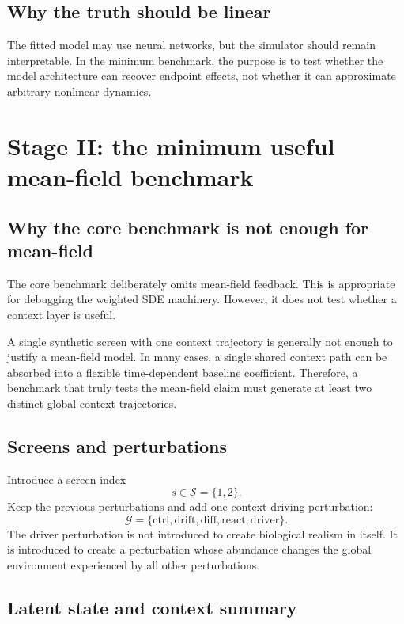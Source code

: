 \documentclass[11pt]{article}
\newcommand{\Gcal}{\mathcal{G}}
\newcommand{\Scal}{\mathcal{S}}
\begin{document}
\subsection{Why the truth should be linear}

The fitted model may use neural networks, but the simulator should remain interpretable. In the minimum benchmark, the purpose is to test whether the model architecture can recover endpoint effects, not whether it can approximate arbitrary nonlinear dynamics.

\section{Stage II: the minimum useful mean-field benchmark}

\subsection{Why the core benchmark is not enough for mean-field}

The core benchmark deliberately omits mean-field feedback. This is appropriate for debugging the weighted SDE machinery. However, it does not test whether a context layer is useful.

A single synthetic screen with one context trajectory is generally not enough to justify a mean-field model. In many cases, a single shared context path can be absorbed into a flexible time-dependent baseline coefficient. Therefore, a benchmark that truly tests the mean-field claim must generate at least two distinct global-context trajectories.

\subsection{Screens and perturbations}

Introduce a screen index
\[
s \in \Scal = \{1,2\}.
\]
Keep the previous perturbations and add one context-driving perturbation:
\[
\Gcal
=
\{\mathrm{ctrl},\mathrm{drift},\mathrm{diff},\mathrm{react},\mathrm{driver}\}.
\]
The driver perturbation is not introduced to create biological realism in itself. It is introduced to create a perturbation whose abundance changes the global environment experienced by all other perturbations.

\subsection{Latent state and context summary}
\end{document}
